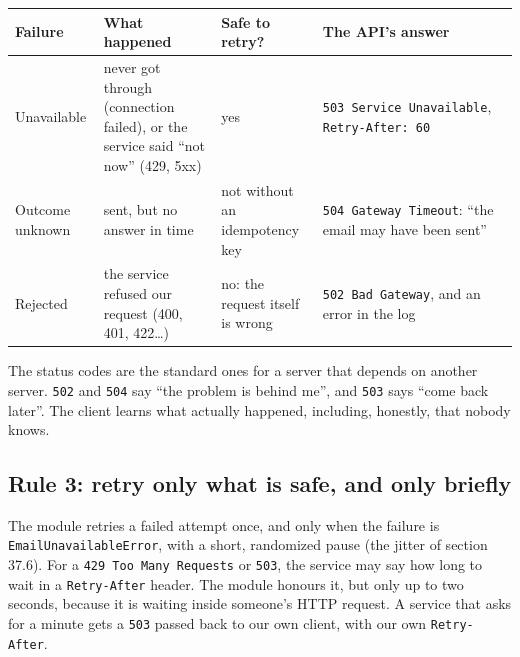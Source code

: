 
{\def\LTcaptype{none} %
\begin{longtable}[]{@{}
  >{\raggedright\arraybackslash}p{}
  >{\raggedright\arraybackslash}p{}
  >{\raggedright\arraybackslash}p{}
  >{\raggedright\arraybackslash}p{}@{}}
\toprule\noalign{}
\begin{minipage}[b]{\linewidth}\raggedright
Failure
\end{minipage} & \begin{minipage}[b]{\linewidth}\raggedright
What happened
\end{minipage} & \begin{minipage}[b]{\linewidth}\raggedright
Safe to retry?
\end{minipage} & \begin{minipage}[b]{\linewidth}\raggedright
The API's answer
\end{minipage} \\
\midrule\noalign{}
\endhead
\bottomrule\noalign{}
\endlastfoot
Unavailable & never got through (connection failed), or the service said ``not now'' (429, 5xx) & yes & \texttt{503\ Service\ Unavailable}, \texttt{Retry-After:\ 60} \\
Outcome unknown & sent, but no answer in time & not without an idempotency key & \texttt{504\ Gateway\ Timeout}: ``the email may have been sent'' \\
Rejected & the service refused our request (400, 401, 422\ldots) & no: the request itself is wrong & \texttt{502\ Bad\ Gateway}, and an error in the log \\
\end{longtable}
}

The status codes are the standard ones for a server that depends on another server. \texttt{502} and \texttt{504} say ``the problem is behind me'', and \texttt{503} says ``come back later''. The client learns what actually happened, including, honestly, that nobody knows.

\subsection*{Rule 3: retry only what is safe, and only briefly}\label{37-reliability:rule-3-retry-only-what-is-safe-and-only-briefly}

The module retries a failed attempt once, and only when the failure is \texttt{EmailUnavailableError}, with a short, randomized pause (the jitter of section 37.6). For a \texttt{429\ Too\ Many\ Requests} or \texttt{503}, the service may say how long to wait in a \texttt{Retry-After} header. The module honours it, but only up to two seconds, because it is waiting inside someone's HTTP request. A service that asks for a minute gets a \texttt{503} passed back to our own client, with our own \texttt{Retry-After}.

